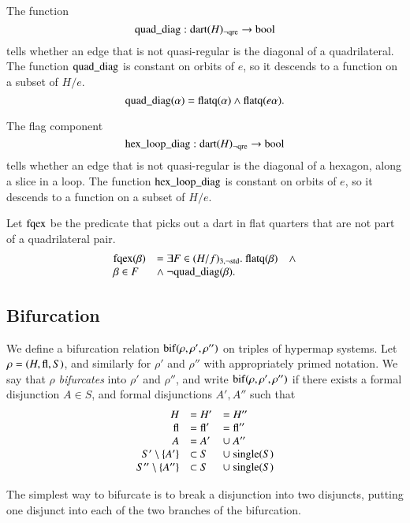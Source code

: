 \begin{definition}
The function
    $${\operatorname{quad\_diag}}:{\operatorname{dart}}(H)_{\neg{\operatorname{qre}}} \to \operatorname{bool}$$
tells whether an edge that is not quasi-regular is the diagonal of
a quadrilateral.  The function ${\operatorname{quad\_diag}}$ is constant on
orbits of $e$, so it descends to a function on a subset of $H/e$.
$$
    {\operatorname{quad\_diag}}(\alpha) = {\operatorname{flatq}}(\alpha)\wedge
    {\operatorname{flatq}}(e\alpha).
$$
\end{definition}

\begin{definition}
The flag component
    $$
    {\operatorname{hex\_loop\_diag}}:{\operatorname{dart}}(H)_{\neg{\operatorname{qre}}}\to\operatorname{bool}
    $$
tells whether an edge that is not quasi-regular is the diagonal of
a hexagon, along a slice in a loop.  The function
${\operatorname{hex\_loop\_diag}}$ is constant on orbits of $e$, so it
descends to a function on a subset of $H/e$.
\end{definition}


\begin{definition}
Let ${\operatorname{fqex}}$ be the predicate that picks out a dart in flat
quarters that are not part of a quadrilateral pair.
\begin{equation}
    \begin{array}{llll}
    \op{fqex}(\beta) &= \exists F\in(H/f)_{3,\neg\op{std}}.\ \op{flatq}(\beta) &\wedge\\
        \beta\in F &\wedge
        \ \neg\op{quad\_diag}(\beta).
    \end{array}
\end{equation}
\end{definition}




\subsection{Bifurcation}



\begin{definition}
We define a bifurcation relation ${\operatorname{bif}}(\rho,\rho',\rho'')$ on
triples of  hypermap systems.  Let $\rho=(H,{\operatorname{fl}},S)$, and
similarly for $\rho'$ and $\rho''$ with appropriately primed
notation.  We say that $\rho$ {\it bifurcates} into $\rho'$ and
$\rho''$, and write ${\operatorname{bif}}(\rho,\rho',\rho'')$ if there exists
a formal disjunction $A\in S$, and formal disjunctions $A',A''$
such that
    $$
    \begin{array}{rlll}
    H &= H' &= H''\\
    {\operatorname{fl}} &= {\operatorname{fl}}' &= {\operatorname{fl}}''\\
        A &= A'&\cup\ A''\\
    S'\setminus  \{A'\} &\subset S &\cup\ {\operatorname{single}}(S)\\
    S''\setminus  \{A''\} &\subset S&\cup\ {\operatorname{single}}(S)\\
    \end{array}
    $$
\end{definition}
The simplest way to bifurcate is to break a disjunction into two
disjuncts, putting one disjunct into each of the two branches of
the bifurcation.



